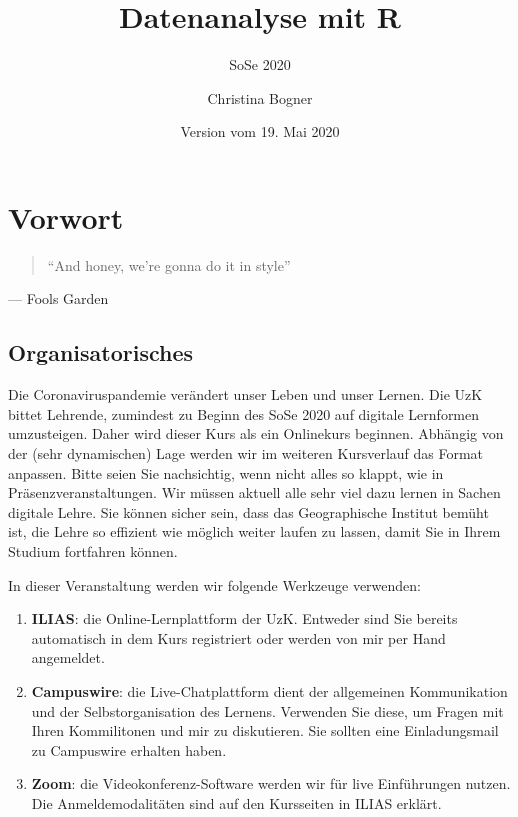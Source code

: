\documentclass[]{book}
\title{Datenanalyse mit R}
\subtitle{SoSe 2020}
\author{Christina Bogner}
\date{Version vom 19. Mai 2020}
\providecommand{\tightlist}{%
  \setlength{\itemsep}{0pt}\setlength{\parskip}{0pt}}
\newenvironment{rmdinfo}{
  \definecolor{info}{rgb}{0.94, 0.97, 1.0}  %
  \color{black}
  \begin{mdframed}[backgroundcolor = info]}
 {\end{mdframed}}
\begin{document}
\maketitle

{
\setcounter{tocdepth}{1}
\tableofcontents
}
\hypertarget{vorwort}{%
\chapter{Vorwort}\label{vorwort}}

\begin{quote}
``And honey, we're gonna do it in style''
\end{quote}

\hfill --- Fools Garden

\hypertarget{organisatorisches}{%
\section{Organisatorisches}\label{organisatorisches}}

\begin{rmdinfo}
Die Coronaviruspandemie verändert unser Leben und unser Lernen. Die UzK
bittet Lehrende, zumindest zu Beginn des SoSe 2020 auf digitale
Lernformen umzusteigen. Daher wird dieser Kurs als ein Onlinekurs
beginnen. Abhängig von der (sehr dynamischen) Lage werden wir im
weiteren Kursverlauf das Format anpassen. Bitte seien Sie nachsichtig,
wenn nicht alles so klappt, wie in Präsenzveranstaltungen. Wir müssen
aktuell alle sehr viel dazu lernen in Sachen digitale Lehre. Sie können
sicher sein, dass das Geographische Institut bemüht ist, die Lehre so
effizient wie möglich weiter laufen zu lassen, damit Sie in Ihrem
Studium fortfahren können.
\end{rmdinfo}

In dieser Veranstaltung werden wir folgende Werkzeuge verwenden:

\begin{enumerate}
\def\labelenumi{\arabic{enumi}.}
\tightlist
\item
  \textbf{ILIAS}: die Online-Lernplattform der UzK. Entweder sind Sie bereits automatisch in dem Kurs registriert oder werden von mir per Hand angemeldet.
\item
  \textbf{Campuswire}: die Live-Chatplattform dient der allgemeinen Kommunikation und der Selbstorganisation des Lernens. Verwenden Sie diese, um Fragen mit Ihren Kommilitonen und mir zu diskutieren. Sie sollten eine Einladungsmail zu Campuswire erhalten haben.
\item
  \textbf{Zoom}: die Videokonferenz-Software werden wir für live Einführungen nutzen. Die Anmeldemodalitäten sind auf den Kursseiten in ILIAS erklärt.
\end{enumerate}
\end{document}
